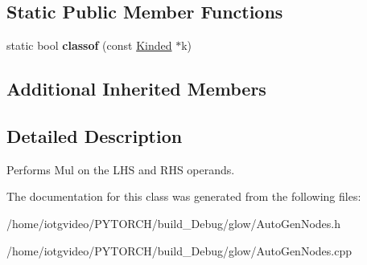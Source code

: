 \subsection*{Static Public Member Functions}
\begin{DoxyCompactItemize}
\item 
\mbox{\label{classglow_1_1_mul_node_aaabbab34088233ceb2c803b6764d4477}} 
static bool {\bfseries classof} (const \hyperlink{classglow_1_1_kinded}{Kinded} $\ast$k)
\end{DoxyCompactItemize}
\subsection*{Additional Inherited Members}


\subsection{Detailed Description}
Performs Mul on the L\+HS and R\+HS operands. 

The documentation for this class was generated from the following files\+:\begin{DoxyCompactItemize}
\item 
/home/iotgvideo/\+P\+Y\+T\+O\+R\+C\+H/build\+\_\+\+Debug/glow/Auto\+Gen\+Nodes.\+h\item 
/home/iotgvideo/\+P\+Y\+T\+O\+R\+C\+H/build\+\_\+\+Debug/glow/Auto\+Gen\+Nodes.\+cpp\end{DoxyCompactItemize}
